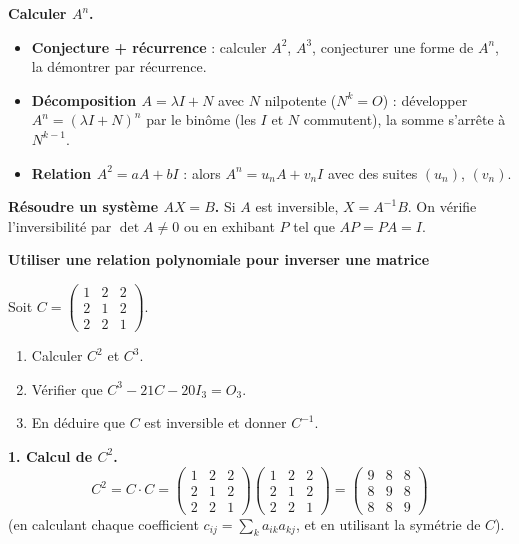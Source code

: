 \begin{methode}
	\textbf{Calculer $A^n$.}
	\begin{itemize}[label=\textbullet]
		\item \textbf{Conjecture + récurrence} : calculer $A^2$, $A^3$,
		conjecturer une forme de $A^n$, la démontrer par récurrence.
		\item \textbf{Décomposition $A = \lambda I + N$} avec $N$ nilpotente
		($N^k = O$) : développer $A^n = (\lambda I + N)^n$ par le binôme (les
		$I$ et $N$ commutent), la somme s'arrête à $N^{k-1}$.
		\item \textbf{Relation $A^2 = a A + b I$} : alors $A^n = u_n A + v_n I$
		avec des suites $(u_n)$, $(v_n)$.
	\end{itemize}
\end{methode}

\begin{methode}
	\textbf{Résoudre un système $AX = B$.} Si $A$ est inversible,
	$X = A^{-1}B$. On vérifie l'inversibilité par $\det A \neq 0$ ou en
	exhibant $P$ tel que $AP = PA = I$.
\end{methode}

\exerciceresolu
\textbf{Utiliser une relation polynomiale pour inverser une matrice}

Soit $C = \begin{pmatrix}1&2&2\\2&1&2\\2&2&1\end{pmatrix}$.
\begin{enumerate}
	\item Calculer $C^2$ et $C^3$.
	\item Vérifier que $C^3 - 21C - 20I_3 = O_3$.
	\item En déduire que $C$ est inversible et donner $C^{-1}$.
\end{enumerate}

\solution

\textbf{1. Calcul de $C^2$.}
\[
C^2 = C\cdot C =
\begin{pmatrix}1&2&2\\2&1&2\\2&2&1\end{pmatrix}
\begin{pmatrix}1&2&2\\2&1&2\\2&2&1\end{pmatrix}
= \begin{pmatrix}9&8&8\\8&9&8\\8&8&9\end{pmatrix}
\]
(en calculant chaque coefficient $c_{ij}=\sum_k a_{ik}a_{kj}$, et en utilisant la symétrie de $C$).

